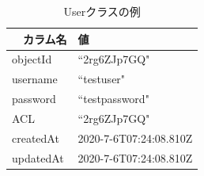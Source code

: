 \begin{table}[htb]
\begin{center}
  \caption{Userクラスの例}
  \begin{tabular}{|l|l|} \hline
 　カラム名 & 値 \\ \hline
    objectId & ``2rg6ZJp7GQ" \\
    username & ``testuser" \\
    password & ``testpassword" \\
    ACL & ``2rg6ZJp7GQ" \\
   createdAt & 2020-7-6T07:24:08.810Z  \\
   updatedAt & 2020-7-6T07:24:08.810Z \\ \hline
  \end{tabular}
  \label{tb:user_class}
\end{center}
\end{table}

